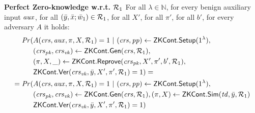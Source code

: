 \begin{definition}[ZK Continuations]
\noindent \textbf{Perfect Zero-knowledge w.r.t. $\mathcal{R}_1$} For all $\lambda \in \mathbb{N}$, for every benign auxiliary input $\mathit{aux}$, 
for all  $(\bar{y}, \bar{x}; \bar{w}_1) \in \mathcal{R}_1$, for all $X'$, for all $\pi'$, for all $b'$, for every adversary $A$ it holds:
\begin{align*}
\mathit{Pr}(& A(\mathit{crs}, \mathit{aux}, \pi, X, \mathcal{R}_1) = 1 \ | \ (\mathit{crs}, \mathit{pp}) \leftarrow {\ensuremath{\mathsf{ZKCont}}}.{\mathsf{Setup}} (1^{\lambda}), \\
                  & (\mathit{crs}_{\mathit{pk}}, \mathit{crs}_{\mathit{vk}}) \leftarrow {\ensuremath{\mathsf{ZKCont}}}.\mathsf{Gen}(\mathit{crs}, \mathcal{R}_1), \\ 
                  & (\pi, X, \_) \leftarrow {\ensuremath{\mathsf{ZKCont}}}.{\mathsf{Reprove}} (\mathit{crs}_{\mathit{pk}}, X', \pi', b', \mathcal{R}_1), \\
                  &  {\mathsf{ZKCont}}.{\mathsf{Ver}}(\mathit{crs}_{\mathit{vk}}, \bar{y}, X', \pi', \mathcal{R}_1) = 1) =  \\
= \mathit{Pr}(& A(\mathit{crs}, \mathit{aux}, \pi, X, \mathcal{R}_1) = 1 \ | \ (\mathit{crs}, \mathit{pp}) \leftarrow {\ensuremath{\mathsf{ZKCont}}}.{\mathsf{Setup}} (1^{\lambda}), \\ 
                     & (\mathit{crs}_{\mathit{pk}}, \mathit{crs}_{\mathit{vk}}) \leftarrow {\ensuremath{\mathsf{ZKCont}}}.\mathsf{Gen}(\mathit{crs}, \mathcal{R}_1), (\pi, X) \leftarrow {\ensuremath{\mathsf{ZKCont}}}.{\mathsf{Sim}}(\mathit{td}, \bar{y}, \mathcal{R}_1) \\ 
                     &  {\mathsf{ZKCont}}.{\mathsf{Ver}}(\mathit{crs}_{\mathit{vk}}, \bar{y}, X', \pi', \mathcal{R}_1) = 1)
\end{align*}

\begin{comment}
\begin{align*}
\mathit{Pr}(& A(\crs, \realaux, \pi', X', \relone) = 1 \ | \ (\crs, \pp) \leftarrow \ZKCont.\Setup (1^{\lambda}), \\
                  & (\crspk, \crsvk) \leftarrow \ZKCont.\Gen(\crs, \relone), \\ 
                  & (\pi', X', \_) \leftarrow \ZKCont.\Reprove (\crspk, X, \pi, b, \relone), \\
                  &  \ZKCont.\Verify(\crsvk, \bary, X, \pi, \relone) = 1) =  \\
= \mathit{Pr}(& A(\crs, \realaux, \pi', X', \relone) = 1 \ | \ (\crs, \pp) \leftarrow \ZKCont.\Setup (1^{\lambda}), \\ 
                     & (\crspk, \crsvk) \leftarrow \ZKCont.\Gen(\crs, \relone), (\pi', X') \leftarrow \ZKCont.\Sim(\tw, \bary, \relone) \\ 
                     &  \ZKCont.\Verify(\crsvk, \bary, X, \pi, \relone) = 1)
\end{align*}
\end{comment}
 
\end{definition} 

